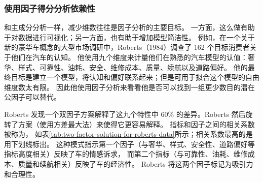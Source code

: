 \begin{table}
    \centering
\end{table}

\subsubsection{使用因子得分分析依赖性}

和主成分分析一样，减少维数往往是因子分析的主要目标。
一方面，这么做有助于对数据进行可视化；另一方面，也有助于增加模型简洁性。
例如，在一个关于新的豪华车概念的大型市场调研中，Roberts（1984）调查了 162 个目标消费者关于他们在汽车的认知。
他使用九个维度来计量他们在熟悉的汽车模型的认值：奢华、样式、可靠性、油耗、安全、维修成本、质量、续航以及道路偏好。
他的最终目标是建立一个模型，将认知和偏好联系起来；但是可用于拟合这个模型的自由维度数太有限。
因此他使用因子分析来看看他是否可以找到一组更少数目的潜在公因子可以替代。

Roberts 发现一个双因子方案解释了这九个特性中 60\% 的差异。Roberts 然后旋转了方案（使用方差最大法）来使得它更容易解释。
指标和因子之间的相关系数被称为，
如表\ref{tab:two-factor-solution-for-roberts-data}所示；相关系数最高的是用下划线标出。
这种模式指示第一个因子（与奢华、样式、安全性、道路偏好等指标高度相关）反映了车的情感诉求，
而第二个指标（与可靠性、油耗、维修成本、质量和续航相关）反映了车的经济性。
Roberts 将这两个因子标记为吸引力和合理性。

